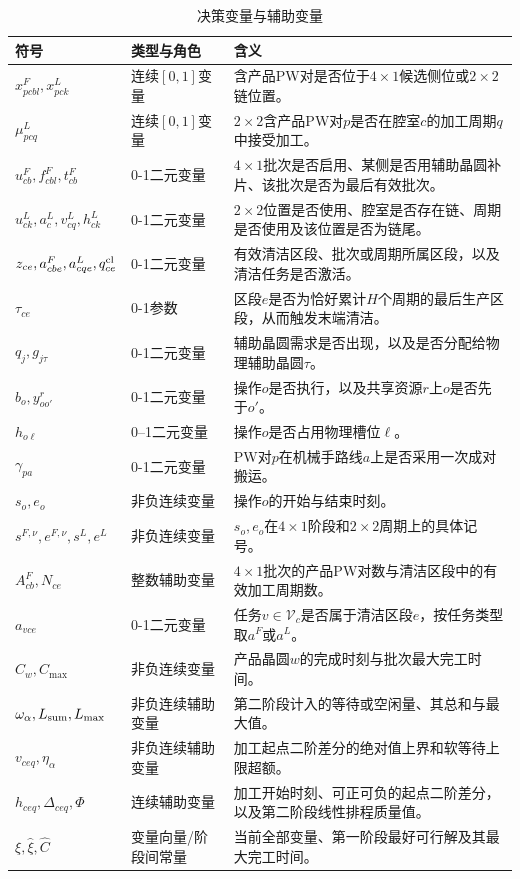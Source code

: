 \documentclass[journal]{IEEEtran}
\begin{document}
\begin{table}[t]
\centering
\footnotesize
\setlength{\tabcolsep}{1pt}
\caption{决策变量与辅助变量}
\label{tab:symbol-cn-b}
\begin{tabular}{C{0.18\textwidth}C{0.15\textwidth}C{0.47\textwidth}}
\toprule
符号 & 类型与角色 & 含义 \\
\midrule
$x^F_{pcbl},x^L_{pck}$ & 连续$[0,1]$变量 & 含产品PW对是否位于$4\times1$候选侧位或$2\times2$链位置。\\
$\mu^L_{pcq}$ & 连续$[0,1]$变量 & $2\times2$含产品PW对$p$是否在腔室$c$的加工周期$q$中接受加工。\\
$u^F_{cb},f^F_{cbl},t^F_{cb}$ & 0-1二元变量 & $4\times1$批次是否启用、某侧是否用辅助晶圆补片、该批次是否为最后有效批次。\\
$u^L_{ck},a^L_c,v^L_{cq},h^L_{ck}$ & 0-1二元变量 & $2\times2$位置是否使用、腔室是否存在链、周期是否使用及该位置是否为链尾。\\
$z_{ce},a^F_{cbe},a^L_{cqe},q^{\rm cl}_{ce}$ & 0-1二元变量 & 有效清洁区段、批次或周期所属区段，以及清洁任务是否激活。\\
$\tau_{ce}$ & 0-1参数 & 区段$e$是否为恰好累计$H$个周期的最后生产区段，从而触发末端清洁。\\
$q_j,g_{j\tau}$ & 0-1二元变量 & 辅助晶圆需求是否出现，以及是否分配给物理辅助晶圆$\tau$。\\
$b_o,y^r_{oo'}$ & 0-1二元变量 & 操作$o$是否执行，以及共享资源$r$上$o$是否先于$o'$。\\
$h_{o\ell}$ & 0--1二元变量 & 操作$o$是否占用物理槽位$\ell$。\\
$\gamma_{pa}$ & 0-1二元变量 & PW对$p$在机械手路线$a$上是否采用一次成对搬运。\\
$s_o,e_o$ & 非负连续变量 & 操作$o$的开始与结束时刻。\\
$s^{F,\nu},e^{F,\nu},s^L,e^L$ & 非负连续变量 & $s_o,e_o$在$4\times1$阶段和$2\times2$周期上的具体记号。\\
$A^F_{cb},N_{ce}$ & 整数辅助变量 & $4\times1$批次的产品PW对数与清洁区段中的有效加工周期数。\\
$a_{vce}$ & 0-1二元变量 & 任务$v\in\mathcal V_c$是否属于清洁区段$e$，按任务类型取$a^F$或$a^L$。\\
$C_w,C_{\max}$ & 非负连续变量 & 产品晶圆$w$的完成时刻与批次最大完工时间。\\
$\omega_\alpha,L_{\rm sum},L_{\max}$ & 非负连续辅助变量 & 第二阶段计入的等待或空闲量、其总和与最大值。\\
$v_{ceq},\eta_\alpha$ & 非负连续辅助变量 & 加工起点二阶差分的绝对值上界和软等待上限超额。\\
$h_{ceq},\Delta_{ceq},\Phi$ & 连续辅助变量 & 加工开始时刻、可正可负的起点二阶差分，以及第二阶段线性排程质量值。\\
$\xi,\widehat\xi,\widehat C$ & 变量向量/阶段间常量 & 当前全部变量、第一阶段最好可行解及其最大完工时间。\\
\bottomrule
\end{tabular}
\end{table}
\end{document}
